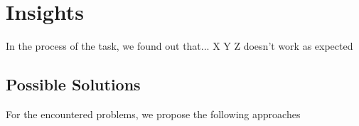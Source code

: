\chapter{Insights}
\label{cha:insights}

In the process of the task, we found out that... X Y Z doesn't work as expected

\section{Possible Solutions}
\label{sec:possibleSolutions}

For the encountered problems, we propose the following approaches

